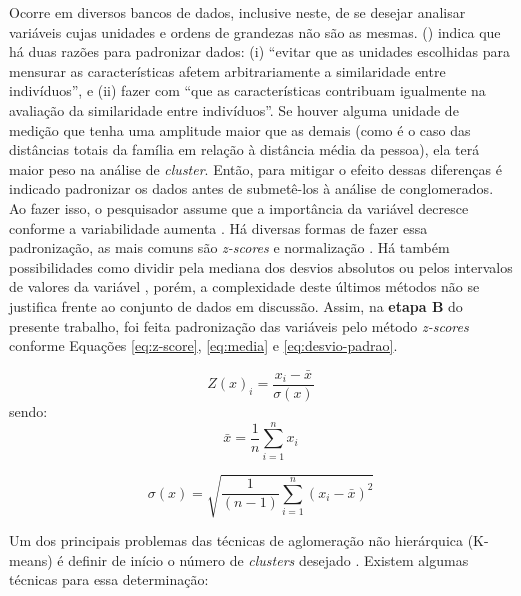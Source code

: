 Ocorre em diversos bancos de dados, inclusive neste, de se desejar analisar variáveis cujas unidades e ordens de grandezas não são as mesmas.
 (\citeyear{FARIA2009}) indica que há duas razões para padronizar dados: (i) ``evitar que as unidades escolhidas para mensurar as características afetem arbitrariamente a similaridade entre indivíduos'', e (ii) fazer com ``que as características contribuam igualmente na avaliação da similaridade entre indivíduos''. Se houver alguma unidade de medição que tenha uma amplitude maior que as demais (como é o caso das distâncias totais da família em relação à distância média da pessoa), ela terá maior peso na análise de \textit{cluster}. Então, para mitigar o efeito dessas diferenças é indicado padronizar os dados antes de submetê-los à análise de conglomerados. Ao fazer isso, o pesquisador assume que a importância da variável decresce conforme a variabilidade aumenta \cite{EVERITT2011}. Há diversas formas de fazer essa padronização, as mais comuns são \textit{z-scores} e normalização \cite{FAVERO2009}. Há também possibilidades como dividir pela mediana dos desvios absolutos ou pelos intervalos de valores da variável , porém, a complexidade deste últimos métodos não se justifica frente ao conjunto de dados em discussão. Assim, na \textbf{etapa B} do presente trabalho, foi feita padronização das variáveis pelo método \textit{z-scores} conforme Equações \eqref{eq:z-score}, \eqref{eq:media} e \eqref{eq:desvio-padrao}.

\begin{equation}\label{eq:z-score}
Z(x)_{i} = \frac{x_{i} - \bar{x}}{\sigma(x)}
\end{equation}
sendo:
\begin{equation}\label{eq:media}
\bar{x} = \frac{1}{n} \sum_{i=1}^{n} x_{i}
\end{equation}

\begin{equation}\label{eq:desvio-padrao}
\sigma(x) = \sqrt{\frac{1}{(n-1)} \sum_{i=1}^{n}(x_{i}-\bar{x})^2 }
\end{equation}

Um dos principais problemas das técnicas de aglomeração não hierárquica \mbox{(K-means)} é definir de início o número de \textit{clusters} desejado \cite{HARTIGAN1985, FAVERO2009, EVERITT2011}. Existem algumas técnicas para essa determinação:

